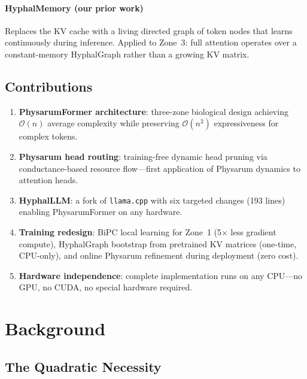 \documentclass[11pt]{article}
\begin{document}
\paragraph{HyphalMemory (our prior work)} Replaces the KV cache with a living directed graph of token nodes that learns continuously during inference. Applied to Zone~3: full attention operates over a constant-memory HyphalGraph rather than a growing KV matrix.

\subsection{Contributions}

\begin{enumerate}
  \item \textbf{PhysarumFormer architecture}: three-zone biological design achieving $\mathcal{O}(n)$ average complexity while preserving $\mathcal{O}(n^2)$ expressiveness for complex tokens.

  \item \textbf{Physarum head routing}: training-free dynamic head pruning via conductance-based resource flow---first application of Physarum dynamics to attention heads.

  \item \textbf{HyphalLLM}: a fork of \texttt{llama.cpp} with six targeted changes (193 lines) enabling PhysarumFormer on any hardware.

  \item \textbf{Training redesign}: BiPC local learning for Zone~1 (5$\times$ less gradient compute), HyphalGraph bootstrap from pretrained KV matrices (one-time, CPU-only), and online Physarum refinement during deployment (zero cost).

  \item \textbf{Hardware independence}: complete implementation runs on any CPU---no GPU, no CUDA, no special hardware required.
\end{enumerate}

\section{Background}
\label{sec:background}

\subsection{The Quadratic Necessity}
\end{document}
